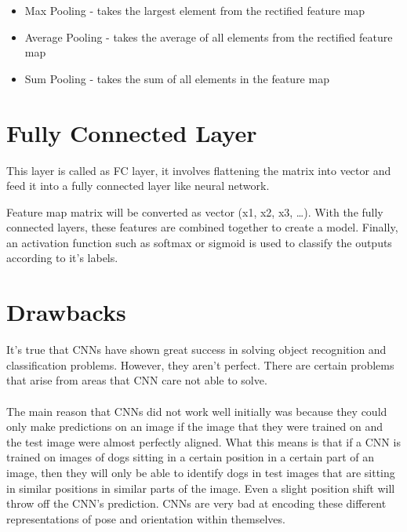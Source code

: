 \documentclass[a4paper,12pt]{report}
\begin{document}
\begin{itemize}
\item Max Pooling - takes the largest element from the rectified feature map
\item Average Pooling - takes the average of all elements from the rectified feature map
\item Sum Pooling -  takes the sum of all elements in the feature map
\end{itemize}

\section{Fully Connected Layer}
This layer is called as FC layer, it involves flattening the matrix into vector and feed it into a fully connected layer like neural network.

Feature map matrix will be converted as vector (x1, x2, x3, …). With the fully connected layers, these features are combined together to create a model. Finally, an activation function such as softmax or sigmoid is used to classify the outputs according to it's labels. 

\section{Drawbacks}
It’s true that CNNs have shown great success in solving object recognition and classification problems. However, they aren’t perfect. There are certain problems that arise from areas that CNN care not able to solve. 

\paragraph{}
The main reason that CNNs did not work well initially was because they could only make predictions on an image if the image that they were trained on and the test image were almost perfectly aligned. What this means is that if a CNN is trained on images of dogs sitting in a certain position in a certain part of an image, then they will only be able to identify dogs in test images that are sitting in similar positions in similar parts of the image. Even a slight position shift will throw off the CNN’s prediction. CNNs are very bad at encoding these different representations of pose and orientation within themselves. 
\end{document}

